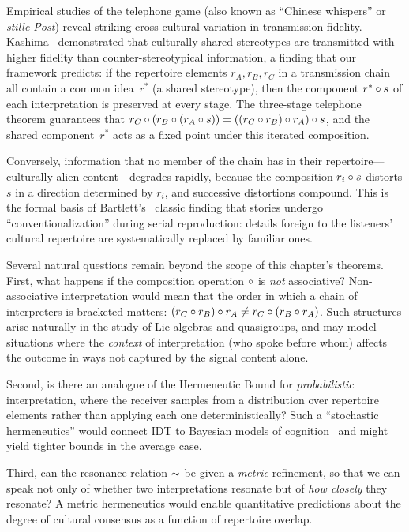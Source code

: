 \begin{example}
\label{ex:telephone-cross-cultural}
Empirical studies of the telephone game (also known as ``Chinese
whispers'' or \emph{stille Post}) reveal striking cross-cultural
variation in transmission fidelity.  Kashima~\cite{kashima2000}
demonstrated that culturally shared stereotypes are transmitted with
higher fidelity than counter-stereotypical information, a finding that
our framework predicts: if the repertoire elements $r_A, r_B, r_C$
in a transmission chain all contain a common idea~$r^*$ (a shared
stereotype), then the component $r^* \circ s$ of each
interpretation is preserved at every stage.  The three-stage telephone
theorem guarantees that $r_C \circ (r_B \circ (r_A \circ s))
= ((r_C \circ r_B) \circ r_A) \circ s$, and the shared
component~$r^*$ acts as a fixed point under this iterated composition.

Conversely, information that no member of the chain has in their
repertoire---culturally alien content---degrades rapidly, because
the composition $r_i \circ s$ distorts $s$ in a direction determined
by $r_i$, and successive distortions compound.  This is the formal
basis of Bartlett's~\cite{bartlett1932} classic finding that stories
undergo ``conventionalization'' during serial reproduction: details
foreign to the listeners' cultural repertoire are systematically
replaced by familiar ones.
\end{example}

\begin{remark}
\label{rem:open-questions}
Several natural questions remain beyond the scope of this chapter's
theorems.  First, what happens if the composition operation $\circ$
is \emph{not} associative?  Non-associative interpretation would mean
that the order in which a chain of interpreters is bracketed matters:
$(r_C \circ r_B) \circ r_A \neq r_C \circ (r_B \circ r_A)$.
Such structures arise naturally in the study of Lie algebras and
quasigroups, and may model situations where the \emph{context} of
interpretation (who spoke before whom) affects the outcome in ways not
captured by the signal content alone.

Second, is there an analogue of the Hermeneutic Bound for
\emph{probabilistic} interpretation, where the receiver samples from a
distribution over repertoire elements rather than applying each one
deterministically?  Such a ``stochastic hermeneutics'' would connect
IDT to Bayesian models of cognition~\cite{tenenbaum2011} and might
yield tighter bounds in the average case.

Third, can the resonance relation $\sim$ be given a
\emph{metric} refinement, so that we can speak not only of whether two
interpretations resonate but of \emph{how closely} they resonate?  A
metric hermeneutics would enable quantitative predictions about the
degree of cultural consensus as a function of repertoire overlap.
\end{remark}

